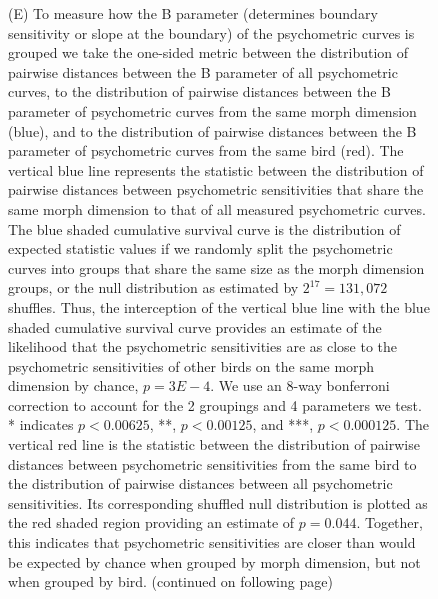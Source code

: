 \begin{figure}[tp]
{(E)	To measure how the B parameter (determines boundary sensitivity or slope at the boundary) of the psychometric curves is grouped we take the one-sided \KS metric between the distribution of pairwise distances between the B parameter of all psychometric curves, to the distribution of pairwise distances between the B parameter of psychometric curves from the same morph dimension (blue), and to the distribution of pairwise distances between the B parameter of psychometric curves from the same bird (red). The vertical blue line represents the \KS statistic between the distribution of pairwise distances between psychometric sensitivities that share the same morph dimension to that of all measured psychometric curves. The blue shaded cumulative survival curve is the distribution of expected \KS statistic values if we randomly split the psychometric curves into groups that share the same size as the morph dimension groups, or the null distribution as estimated by $2^{17}=131,072$ shuffles. Thus, the interception of the vertical blue line with the blue shaded cumulative survival curve provides an estimate of the likelihood that the psychometric sensitivities are as close to the psychometric sensitivities of other birds on the same morph dimension by chance, $p=3E-4$. We use an 8-way bonferroni correction to account for the 2 groupings and 4 parameters we test. * indicates $p<0.00625$, **, $p<0.00125$, and ***, $p<0.000125$. The vertical red line is the \KS statistic between the distribution of pairwise distances between psychometric sensitivities from the same bird to the distribution of pairwise distances between all psychometric sensitivities. Its corresponding shuffled null distribution is plotted as the red shaded region providing an estimate of $p=0.044$. Together, this indicates that psychometric sensitivities are closer than would be expected by chance when grouped by morph dimension, but not when grouped by bird. (continued on following page)
}
\end{figure}


